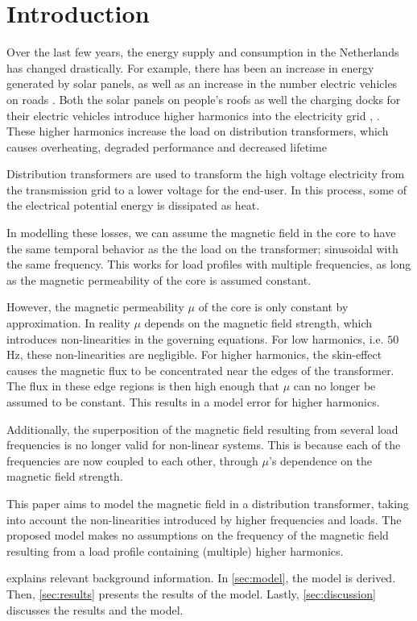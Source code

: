 \chapter{Introduction}

Over the last few years, the energy supply and consumption in the Netherlands has changed drastically. For example, there has been an increase in energy generated by solar panels, as well as an increase in the number electric vehicles on roads \citehere. 
Both the solar panels on people's roofs as well the charging docks for their electric vehicles introduce higher harmonics into the electricity grid \cite{energietransitie}, \cite{energieVerbenCons}.
These higher harmonics increase the load on distribution transformers, which causes overheating, degraded performance and decreased lifetime \cite{vanDijk2022}

Distribution transformers are used to transform the high voltage electricity from the transmission grid to a lower voltage for the end-user.
In this process, some of the electrical potential energy is dissipated as heat. 

In modelling these losses, we can assume the magnetic field in the core to have the same temporal behavior as the the load on the transformer; sinusoidal with the same frequency. \citehere 
This works for load profiles with multiple frequencies, as long as the magnetic permeability of the core is assumed constant.

However, the magnetic permeability $\mu$ of the core is only constant by approximation. In reality $\mu$ depends on the magnetic field strength, which introduces non-linearities in the governing equations.
For low harmonics, i.e. $50$ Hz, these non-linearities are negligible.
For higher harmonics, the skin-effect causes the magnetic flux to be concentrated near the edges of the transformer. 
The flux in these edge regions is then high enough that $\mu$ can no longer be assumed to be constant. 
This results in a model error for higher harmonics.

Additionally, the superposition of the magnetic field resulting from several load frequencies is no longer valid for non-linear systems.
This is because each of the frequencies are now coupled to each other, through $\mu$'s dependence on the magnetic field strength.

This paper aims to model the magnetic field in a distribution transformer, taking into account the non-linearities introduced by higher frequencies and loads.
The proposed model makes no assumptions on the frequency of the magnetic field resulting from a load profile containing (multiple) higher harmonics.

 explains relevant background information. 
In \cref{sec:model}, the model is derived. 
Then, \cref{sec:results} presents the results of the model. 
Lastly, \cref{sec:discussion} discusses the results and the model.

